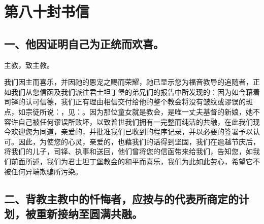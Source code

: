 
\section{第八十封书信}

\par


\subsection{一、他因证明自己为正统而欢喜。}

主教，致主教。\par

我们因主而喜乐，并因祂的恩宠之赐而荣耀，祂已显示您为福音教导的追随者，正如我们从您信函及我们派往君士坦丁堡的弟兄们的报告中所发现的：因为如今藉着司铎的认可信德，我们正有理由相信交付给他的整个教会将没有皱纹或谬误的斑点，如宗徒所说：，见：。因为那位童女就是教会，是唯一丈夫基督的新娘，她不容许自己被任何谬误所败坏，以致普世我们拥有一完整而纯洁的共融，在此我们现今欢迎您为同道，亲爱的，并批准我们已收到的程序记录，并以必要的签署予以认可。因此，为使您的心灵，亲爱的，也藉我们的话得到坚固，我们在逾越节庆后，将我们的儿子，司铎、执事和送回，他们曾将您的信函带来给我们，告知您，如我们前面所述，我们为君士坦丁堡教会的和平而喜乐，我们为此如此劳心，希望它不被任何异端欺骗所污染。\par


\subsection{二、背教主教中的忏悔者，应按与的代表所商定的计划，被重新接纳至圆满共融。}


